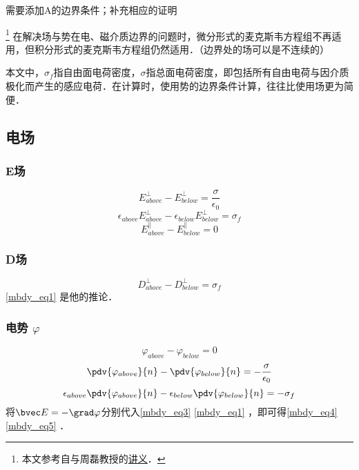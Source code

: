 
\begin{issues}
\issueTODO 需要添加A的边界条件；补充相应的证明
\end{issues}

\footnote{本文参考自\cite{GriffE}与周磊教授的\href{http://fdjpkc.fudan.edu.cn/d200927/2009/0314/c8569a14801/page.htm}{讲义}．}
在解决场与势在电、磁介质边界的问题时，微分形式的麦克斯韦方程组不再适用，但积分形式的麦克斯韦方程组仍然适用．（边界处的场可以是不连续的）

本文中，$\sigma_f$指自由面电荷密度，$\sigma$指总面电荷密度，即包括所有自由电荷与因介质极化而产生的感应电荷．在计算时，使用势的边界条件计算，往往比使用场更为简便．

\subsection{电场}

\subsubsection{E场}
\begin{equation}\label{mbdy_eq3}
E^\perp_{above} - E^\perp_{below} = \frac{\sigma}{\epsilon_0}
\end{equation}
\begin{equation}\label{mbdy_eq1}
\epsilon_{above}E^\perp_{above} - \epsilon_{below}E^\perp_{below} = \sigma_f
\end{equation}
\begin{equation}
E^\parallel_{above} - E^\parallel_{below} = 0
\end{equation}

\subsubsection{D场}
\begin{equation}
D^\perp_{above} - D^\perp_{below} = \sigma_f
\end{equation}
\autoref{mbdy_eq1} 是他的推论．

\subsubsection{电势 $\varphi$}
\begin{equation}
\varphi_{above}-\varphi_{below}=0
\end{equation}
\begin{equation}\label{mbdy_eq4}
\pdv{\varphi_{above}}{n} - \pdv{\varphi_{below}}{n}  = -\frac{\sigma}{\epsilon_0}
\end{equation}
\begin{equation}\label{mbdy_eq5}
\epsilon_{above}\pdv{\varphi_{above}}{n} - \epsilon_{below}\pdv{\varphi_{below}}{n}  = -\sigma_f
\end{equation}
将$\bvec E= -\grad \varphi$分别代入\autoref{mbdy_eq3} \autoref{mbdy_eq1} ，即可得\autoref{mbdy_eq4} \autoref{mbdy_eq5} ．
